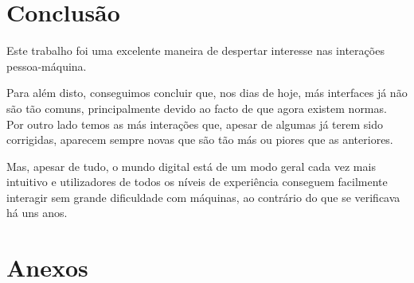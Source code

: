 \documentclass[11pt]{article}
\begin{document}
	\large
	\section{Conclusão}
	
	\normalsize
	Este trabalho foi uma excelente maneira de despertar interesse nas interações pessoa-máquina.
	
	Para além disto, conseguimos concluir que, nos dias de hoje, más interfaces já não são tão comuns, principalmente devido ao facto de que agora existem normas. Por outro lado temos as más interações que, apesar de algumas já terem sido corrigidas, aparecem sempre novas que são tão más ou piores que as anteriores. 
	
	Mas, apesar de tudo, o mundo digital está de um modo geral cada vez mais intuitivo e utilizadores de todos os níveis de experiência conseguem facilmente interagir sem grande dificuldade com máquinas, ao contrário do que se verificava há uns anos.
	
	\pagebreak
	
	\large
	\section{Anexos}

	\normalsize
	\listoffigures
\end{document}
